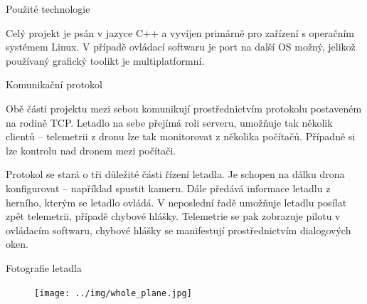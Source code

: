 \documentclass[final]{beamer}
\newlength{\colwidth}
\begin{document}
\begin{frame}[t]
\begin{columns}[t]
\begin{column}{\colwidth}
\begin{block}{Použité technologie}
\begin{figure}
          \hfill
          \hfill

        \end{figure}

			Celý projekt je psán v jazyce C++ a vyvíjen primárně pro zařízení s operačním systémem Linux.
			V případě ovládací softwaru je port na další OS možný, jelikož používaný grafický toolikt je multiplatformní.



      \end{block}

      \begin{block}{Komunikační protokol}

				Obě části projektu mezi sebou komunikují prostřednictvím protokolu postaveném na rodině TCP.
				Letadlo na sebe přejímá roli serveru, umožňuje tak několik clientů -- telemetrii z dronu lze tak monitorovat z několika počítačů.
				Případně si lze  kontrolu nad dronem mezi počítači.

				Protokol se stará o tři důležité části řízení letadla.
				Je schopen na dálku drona konfigurovat -- například spustit kameru.
				Dále předává informace letadlu z herního, kterým se letadlo ovládá.
				V neposlední řadě umožňuje letadlu posílat zpět telemetrii, případě chybové hlášky.
				Telemetrie se pak zobrazuje pilotu v ovládacím softwaru, chybové hlášky se manifestují prostřednictvím dialogových oken.
      \end{block}

      \begin{block}{Fotografie letadla}


				\begin{figure}[h]
					\centering
					\texttt{[image: ../img/whole\_plane.jpg]}
				\end{figure}

      \end{block}

    \end{column}


\end{columns}
\end{frame}
\end{document}
